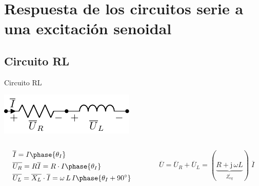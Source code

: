 \documentclass[aspectratio=169, xcolor={usenames,svgnames,dvipsnames}]{beamer}
\begin{document}
\section{Respuesta de los circuitos serie a una excitación senoidal}

\subsection{Circuito RL}

\begin{frame}{Circuito RL}
\begin{center}
\includegraphics[height=0.2\textheight]{../figs/RL.pdf}
\end{center}

\begin{columns}
\begin{column}{0.45\columnwidth}
\begin{align*}
&\overline{I}=I\phase{\theta_I}\\
    &\overline{U_R} = R \overline{I}=R\cdot I\phase{\theta_I}\\ 
	&\overline{U_L}=\overline{X_L}\cdot\overline{I}= \omega\,L\,I\phase{\theta_I+90^\circ}
\end{align*}
\end{column}

\begin{column}{0.55\columnwidth}
\begin{equation*}
  \overline{U} = \overline{U}_R + \overline{U}_L =(\underbrace{R + \mathrm{j}\,\omega L}_{\overline{Z_{eq}}})\; \overline{I}
\end{equation*}
\end{column}
\end{columns}
\end{frame}
\end{document}

